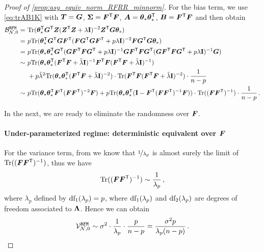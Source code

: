 \begin{proof}[Proof of \cref{prop:asy_equiv_norm_RFRR_minnorm}]
For the bias term, we use \cref{eq:trAB1K} with $\bT=\bG$, $\bSigma=\bF^\sT\bF$, $\bA=\btheta_* \btheta_*^\sT$, $\bB=\bF^\sT\bF$ and then obtain
\[
\begin{aligned}
\mathcal{B}_{\mathcal{N},0}^{\tt RFM} =&~ \Tr(\btheta_*^\sT \bG^\sT \bZ (\bZ^\sT \bZ + \lambda\id)^{-2} \bZ^\sT \bG\btheta_* )\\
=&~ p\Tr(\btheta_*^\sT \bG^\sT \bG \bF^\sT (\bF \bG^\sT \bG \bF^\sT + p\lambda\id)^{-2} \bF \bG^\sT \bG \btheta_* )\\
=&~ p\Tr(\btheta_* \btheta_*^\sT \bG^\sT ( \bG \bF^\sT \bF \bG^\sT + p\lambda\id)^{-1} \bG \bF^\sT \bF \bG^\sT ( \bG \bF^\sT \bF \bG^\sT + p\lambda\id)^{-1} \bG )\\
\sim&~ p\Tr(\btheta_* \btheta_*^\sT ( \bF^\sT \bF + \tilde\lambda\id)^{-1} \bF^\sT \bF ( \bF^\sT \bF + \tilde\lambda\id)^{-1} )\\ 
&~+ p \tilde\lambda^2 \Tr(\btheta_* \btheta_*^\sT ( \bF^\sT \bF + \tilde\lambda\id)^{-2}) \cdot \Tr(\bF^\sT \bF  ( \bF^\sT \bF + \tilde\lambda\id)^{-2}) \cdot \frac{1}{n-p}\\
\sim&~ p\Tr(\btheta_* \btheta_*^\sT \bF^\sT ( \bF \bF^\sT )^{-2} \bF) + p \Tr(\btheta_* \btheta_*^\sT ( \id - \bF^\sT (\bF\bF^\sT)^{-1} \bF )) \cdot \Tr(( \bF \bF^\sT)^{-1}) \cdot \frac{1}{n-p}\,.
\end{aligned}
\]

In the next, we are ready to eliminate the randomness over $\bF$.
\paragraph{Under-parameterized regime: deterministic equivalent over $\bF$}
For the variance term, from \citet[Sec 3.2]{bach2024high} we know that $\nicefrac{1}{\lambda_p}$ is almost surely the limit of $\Tr((\bF\bF^\sT)^{-1})$, thus we have
\[
\begin{aligned}
\Tr((\bF\bF^\sT)^{-1}) \sim \frac{1}{\lambda_p}\,,
\end{aligned}
\]
where $\lambda_p$ defined by ${\rm df_1}(\lambda_p) = p$, where ${\rm df_1}(\lambda_p)$ and ${\rm df_2}(\lambda_p)$ are degrees of freedom associated to $\bLambda$. Hence we can obtain
\[
\begin{aligned}
\mathcal{V}_{\mathcal{N},0}^{\tt RFM} \sim \sigma^2 \cdot \frac{1}{\lambda_p} \cdot \frac{p}{n-p} = \frac{\sigma^2p}{\lambda_p(n-p)}\,.
\end{aligned}
\]


\end{proof}
